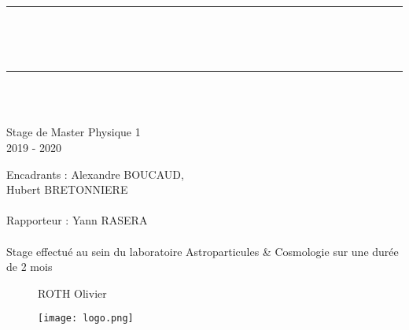 \documentclass[12pt]{article}
\numberwithin{equation}{section} %
\newcommand{\HRule}{\rule{\linewidth}{0.5mm}} %
\begin{document}
\thispagestyle{empty}

\phantom{.}
\vspace*{4cm}
\hspace*{-1.1cm} 
\HRule
 { \Huge \bfseries {}\\[0cm] }
\rule{0cm}{0cm}
\\
\HRule 
\\ \\
\begin{center}
	\huge{Stage de Master Physique 1}
	\vspace{.5cm}
	\\ 2019 - 2020
	\vspace{1cm}
\end{center}



\begin{Large}
\noindent Encadrants : Alexandre BOUCAUD, 
\\ \hspace*{3cm} Hubert BRETONNIERE
\\
\\ Rapporteur : Yann RASERA
\\ \\
Stage effectué au sein du laboratoire Astroparticules \& Cosmologie sur une durée de 2 mois
\end{Large}



\vspace{.5cm}
\begin{figure}[h!]
	\begin{minipage}[c]{.6\linewidth}
		\begin{Large}
		ROTH Olivier
		\end{Large}
	\end{minipage}
	\begin{minipage}[c]{.1\linewidth}
		\texttt{[image: logo.png]}
	\end{minipage}
\end{figure}



\newpage
\thispagestyle{empty}
\tableofcontents



\newpage
\thispagestyle{plain}
\setcounter{page}{1}
\end{document}

